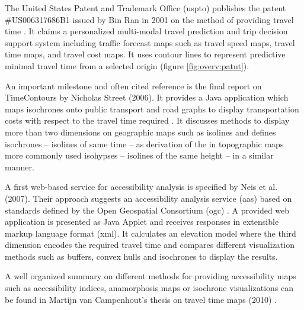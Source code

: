     The United States Patent and Trademark Office (\acrshort{uspto}) publishes
    the patent \#US006317686B1 issued by Bin Ran in 2001 on the method of
    providing travel time \cite{ran2001method}. It claims a personalized
    multi-modal travel prediction and trip decision support system including
    traffic forecast maps such as travel speed maps, travel time maps, and
    travel cost maps. It uses contour lines to represent predictive minimal
    travel time from a selected origin (figure \ref{fig:overv:patnt}).\par


    An important milestone and often cited reference is the final report on
    TimeContours by Nicholas Street (2006). It provides a Java application which
    maps isochrones onto public transport and road graphs to display
    transportation costs with respect to the travel time required
    \cite{street2006timecontours}. It discusses methods to display more than two
    dimensions on geographic maps such as isolines and defines isochrones --
    isolines of same time -- as derivation of the in topographic maps more
    commonly used isohypses -- isolines of the same height -- in a similar
    manner.\par


    A first web-based service for accessibility analysis is specified by
    Neis et al. (2007). Their approach suggests an accessibility analysis
    service (\acrshort{aas}) based on standards defined by the Open Geospatial
    Consortium (\acrshort{ogc}) \cite{neis2007webbasierte}. A provided web
    application is presented as Java Applet and receives responses in extensible
    markup language format (\acrshort{xml}). It calculates an elevation model
    where the third dimension encodes the required travel time and compares
    different visualization methods such as buffers, convex hulls and isochrones
    to display the results.\par

    A well organized summary on different methods for providing accessibility
    maps such as accessibility indices, anamorphosis maps or isochrone
    visualizations can be found in Martijn van Campenhout's thesis on travel
    time maps (2010) \cite{van2010travel}.\par

